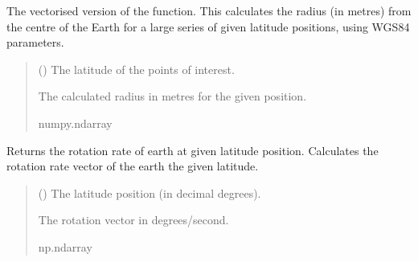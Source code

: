 \documentclass[letterpaper,10pt,english]{sphinxmanual}
\begin{document}

\begin{fulllineitems}
\label{\detokenize{modules/util/transformations:qnav.util.transformations.radius_vec}}
\pysigstartsignatures
{}
\pysigstopsignatures
\sphinxAtStartPar
The vectorised version of the
{\hyperref[\detokenize{modules/util/transformations:qnav.util.transformations.radius}]{}} function. This
calculates the radius (in metres) from the centre of the Earth for a large
series of given latitude positions, using WGS84 parameters.
\begin{quote}\begin{description}
\sphinxAtStartPar
{} () \textendash{} The latitude of the points of interest.

\sphinxAtStartPar
The calculated radius in metres for the given position.

\sphinxAtStartPar
numpy.ndarray

\end{description}\end{quote}

\end{fulllineitems}


\begin{fulllineitems}
\label{\detokenize{modules/util/transformations:qnav.util.transformations.rotation_rate}}
\pysigstartsignatures
{}
\pysigstopsignatures
\sphinxAtStartPar
Returns the rotation rate of earth at given latitude position.
Calculates the rotation rate vector of the earth the given latitude.
\begin{quote}\begin{description}
\sphinxAtStartPar
{} () \textendash{} The latitude position (in decimal degrees).

\sphinxAtStartPar
The rotation vector in degrees/second.

\sphinxAtStartPar
np.ndarray

\end{description}\end{quote}

\end{fulllineitems}
\end{document}
